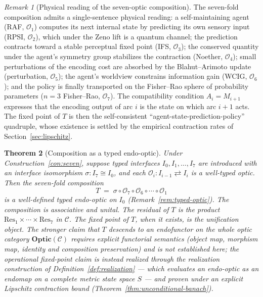 \documentclass[11pt,a4paper]{article}
\theoremstyle{plain}
\newtheorem{theorem}{Theorem}[section]
\theoremstyle{definition}
\theoremstyle{remark}
\newtheorem{remark}[theorem]{Remark}
\newcommand{\OO}{\mathcal{O}}
\newcommand{\CC}{\mathcal{C}}
\newcommand{\Optic}{\mathbf{Optic}}
\begin{document}
\begin{remark}[Physical reading of the seven-optic composition]
\label{rem:optics-physical}
The seven-fold composition admits a single-sentence physical reading:
a self-maintaining agent (RAF, $\OO_1$) computes its next internal
state by predicting its own sensory input (RPSI, $\OO_2$), which under
the Zeno lift is a quantum channel; the prediction contracts toward a
stable perceptual fixed point (IFS, $\OO_3$); the conserved quantity
under the agent's symmetry group stabilizes the contraction (Noether,
$\OO_4$); small perturbations of the encoding cost are absorbed by the
Blahut--Arimoto update (perturbation, $\OO_5$); the agent's worldview
constrains information gain (WCIG, $\OO_6$); and the policy is finally
transported on the Fisher--Rao sphere of probability parameters
($n=3$ Fisher--Rao, $\OO_7$). The compatibility condition
$A_i = M_{i+1}$ expresses that the encoding output of arc $i$ is the
state on which arc $i+1$ acts. The fixed point of $T$ is then the
self-consistent ``agent-state-prediction-policy'' quadruple, whose
existence is settled by the empirical contraction rates of
Section~\ref{sec:lipschitz}.
\end{remark}

\begin{theorem}[Composition as a typed endo-optic]\label{thm:composition}
Under Construction~\ref{con:seven}, suppose typed interfaces
$I_0, I_1, \ldots, I_7$ are introduced with an interface isomorphism
$\sigma : I_7 \cong I_0$, and each $\OO_i : I_{i-1} \rightleftarrows I_i$
is a well-typed optic. Then the seven-fold composition
\begin{equation}\label{eq:comp}
  T \;=\; \sigma \circ \OO_7 \circ \OO_6 \circ \cdots \circ \OO_1
\end{equation}
is a well-defined \emph{typed endo-optic} on $I_0$ (Remark~\ref{rem:typed-optic}).
The composition is associative and unital. The residual of $T$ is the
product $\mathrm{Res}_1 \times \cdots \times \mathrm{Res}_7$ in $\CC$.
The fixed point of $T$, when it exists, is the \emph{unification object}.
The stronger claim that $T$ descends to an endofunctor on the whole
optic category $\Optic(\CC)$ requires explicit functorial semantics
(object map, morphism map, identity and composition preservation) and is
not established here; the operational fixed-point claim is instead
realized through the realization construction of
Definition~\ref{def:realization} --- which evaluates an endo-optic as
an endomap on a complete metric state space $S$ --- and proven under an
explicit Lipschitz contraction bound
(Theorem~\ref{thm:unconditional-banach}).
\end{theorem}
\end{document}
